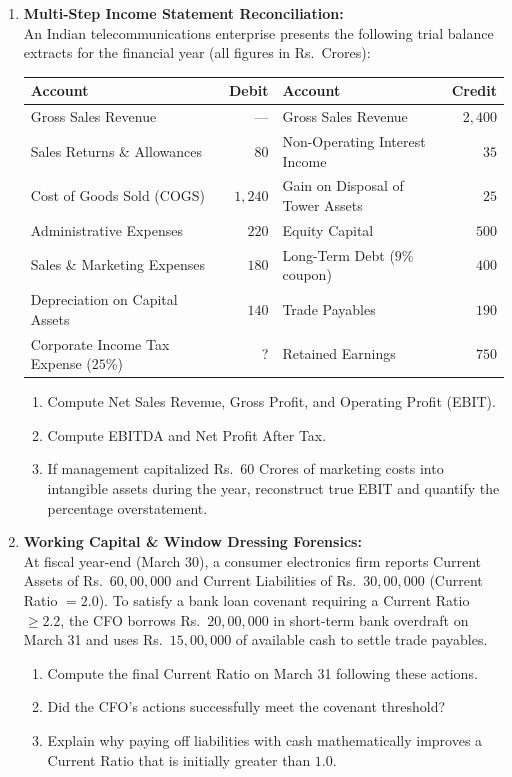 \begin{enumerate}[label=\textbf{P2.\arabic*}]
    \item \textbf{Multi-Step Income Statement Reconciliation:}\\
    An Indian telecommunications enterprise presents the following trial balance extracts for the financial year (all figures in Rs.~Crores):
    \begin{center}
    \begin{tabular}{lr|lr}
    \toprule
    \textbf{Account} & \textbf{Debit} & \textbf{Account} & \textbf{Credit} \\
    \midrule
    Gross Sales Revenue & --- & Gross Sales Revenue & $2{,}400$ \\
    Sales Returns \& Allowances & $80$ & Non-Operating Interest Income & $35$ \\
    Cost of Goods Sold (COGS) & $1{,}240$ & Gain on Disposal of Tower Assets & $25$ \\
    Administrative Expenses & $220$ & Equity Capital & $500$ \\
    Sales \& Marketing Expenses & $180$ & Long-Term Debt ($9\%$ coupon) & $400$ \\
    Depreciation on Capital Assets & $140$ & Trade Payables & $190$ \\
    Corporate Income Tax Expense ($25\%$) & ? & Retained Earnings & $750$ \\
    \bottomrule
    \end{tabular}
    \end{center}
    \begin{enumerate}[label=(\alph*)]
        \item Compute Net Sales Revenue, Gross Profit, and Operating Profit (EBIT).
        \item Compute EBITDA and Net Profit After Tax.
        \item If management capitalized Rs.~$60$ Crores of marketing costs into intangible assets during the year, reconstruct true EBIT and quantify the percentage overstatement.
    \end{enumerate}

    \item \textbf{Working Capital \& Window Dressing Forensics:}\\
    At fiscal year-end (March 30), a consumer electronics firm reports Current Assets of Rs.~$60{,}00{,}000$ and Current Liabilities of Rs.~$30{,}00{,}000$ (Current Ratio $= 2.0$). To satisfy a bank loan covenant requiring a Current Ratio $\ge 2.2$, the CFO borrows Rs.~$20{,}00{,}000$ in short-term bank overdraft on March 31 and uses Rs.~$15{,}00{,}000$ of available cash to settle trade payables.
    \begin{enumerate}[label=(\alph*)]
        \item Compute the final Current Ratio on March 31 following these actions.
        \item Did the CFO's actions successfully meet the covenant threshold?
        \item Explain why paying off liabilities with cash mathematically improves a Current Ratio that is initially greater than $1.0$.
    \end{enumerate}


\end{enumerate}
